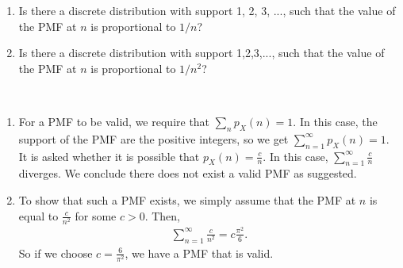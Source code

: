 
\setcounter{theorem}{5}
\begin{exercise}[BH.3.10]
	\begin{enumerate}
		\item Is there a discrete distribution with support 1, 2, 3, ..., such that the value of the PMF at $n$ is proportional to $1/n$?
		\item Is there a discrete distribution with support 1,2,3,..., such that the value of the PMF at $n$ is proportional to $1/n^2$?
	\end{enumerate}
\begin{solution}~
	\begin{enumerate}
		\item For a PMF to be valid, we require that $\sum_{n}p_{X}(n)=1$. In this case, the support of the PMF are the positive integers, so we get $\sum_{n=1}^{\infty}p_{X}(n)=1$. It is asked whether it is possible that $p_{X}(n) = \frac{c}{n}$. In this case, $\sum_{n=1}^{\infty}\frac{c}{n}$  diverges. We conclude there does not exist a valid PMF as suggested.
		\item To show that such a PMF exists, we simply assume that the PMF at $n$ is equal to $\frac{c}{n^2}$ for some $c>0$. Then,
		\begin{align*}
			\sum_{n=1}^{\infty}\frac{c}{n^2} = c\frac{\pi^2}{6}.
		\end{align*}
		So if we choose $c=\frac{6}{\pi^2}$, we have a PMF that is valid.
	\end{enumerate}
\end{solution}
\end{exercise}


